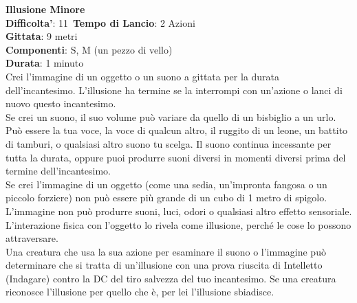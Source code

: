 \begin{multicols}{2}
\medskip\textbf{Illusione Minore}\\
\textbf{Difficolta'}: 11\
\textbf{Tempo di Lancio}: 2 Azioni\\
\textbf{Gittata}: 9 metri\\
\textbf{Componenti}: S, M (un pezzo di vello)\\
\textbf{Durata}: 1 minuto\\
Crei l’immagine di un oggetto o un suono a gittata per la durata dell’incantesimo. L’illusione ha termine se la interrompi con un’azione o lanci di nuovo questo incantesimo.\\
Se crei un suono, il suo volume può variare da quello di un bisbiglio a un urlo. Può essere la tua voce, la voce di qualcun altro, il ruggito di un leone, un battito di tamburi, o qualsiasi altro suono tu scelga. Il suono continua incessante per tutta la durata, oppure puoi produrre suoni diversi in momenti diversi prima del termine dell’incantesimo.\\
Se crei l’immagine di un oggetto (come una sedia, un’impronta fangosa o un piccolo forziere) non può essere più grande di un cubo di 1 metro di spigolo. L’immagine non può produrre suoni, luci, odori o qualsiasi altro effetto sensoriale. L’interazione fisica con l’oggetto lo rivela come illusione, perché le cose lo possono attraversare.\\
Una creatura che usa la sua azione per esaminare il suono o l’immagine può determinare che si tratta di un’illusione con una prova riuscita di Intelletto (Indagare) contro la DC del tiro salvezza del tuo incantesimo. Se una creatura riconosce l’illusione per quello che è, per lei l’illusione sbiadisce. 


\end{multicols}
